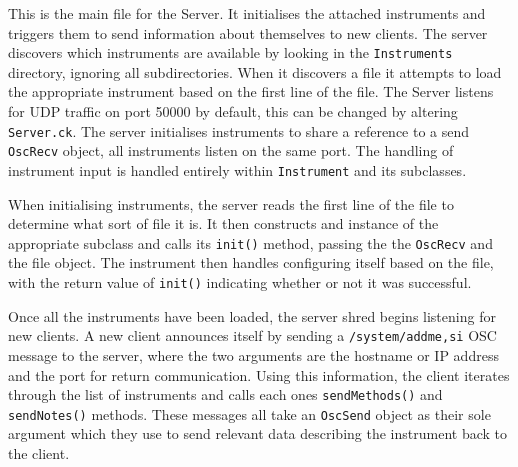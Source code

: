 \documentclass[../main.tex]{subfiles}
\begin{document}
This is the main file for the Server. It initialises the attached instruments and triggers them to send information about themselves to new clients.
The server discovers which instruments are available by looking in the \texttt{Instruments} directory, ignoring all subdirectories. When it discovers
a file it attempts to load the appropriate instrument based on the first line of the file. The Server listens for UDP traffic on port 50000 by default, this can be 
changed by altering \texttt{Server.ck}. The server initialises instruments to share a reference to a send \texttt{OscRecv} object, all instruments listen on the same 
port. The handling of instrument input is handled entirely within \texttt{Instrument} and its subclasses. 

When initialising instruments, the server reads the first line of the file to determine what sort of file it is. It then constructs and instance of the appropriate subclass
and calls its \texttt{init()} method, passing the the \texttt{OscRecv} and the file object. The instrument then handles configuring itself based on the file, with the 
return value of \texttt{init()} indicating whether or not it was successful.

Once all the instruments have been loaded, the server shred begins listening for new clients. A new client announces itself by sending a \texttt{/system/addme,si} 
OSC message to the server, where the two arguments are the hostname or IP address and the port for return communication. Using this information, the client 
iterates through the list of instruments and calls each ones \texttt{sendMethods()} and \texttt{sendNotes()} methods. These messages all take an \texttt{OscSend}
object as their sole argument which they use to send relevant data describing the instrument back to the client.
\end{document}
